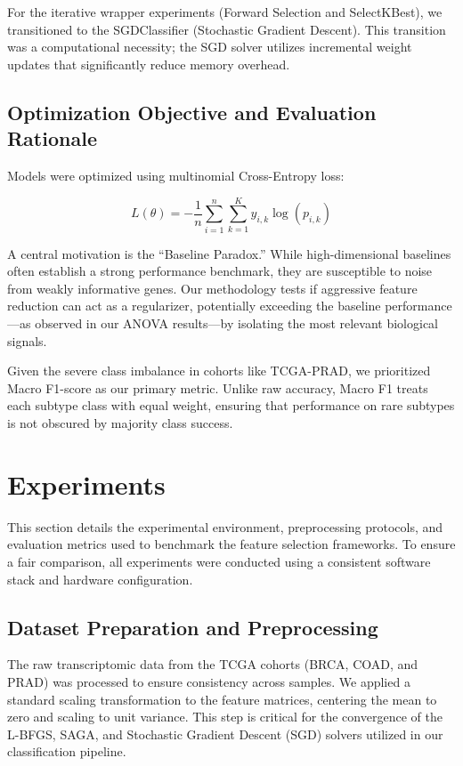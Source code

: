 \documentclass{article}
\begin{document}
For the iterative wrapper experiments (Forward Selection and SelectKBest), we transitioned to the SGDClassifier (Stochastic Gradient Descent). This transition was a computational necessity; the SGD solver utilizes incremental weight updates that significantly reduce memory overhead.

\subsection{Optimization Objective and Evaluation Rationale}

Models were optimized using multinomial Cross-Entropy loss:

\[
L(\theta) =
-\frac{1}{n}
\sum_{i=1}^{n}
\sum_{k=1}^{K}
y_{i,k}\log(p_{i,k})
\]

A central motivation is the ``Baseline Paradox.'' While high-dimensional baselines often establish a strong performance benchmark, they are susceptible to noise from weakly informative genes. Our methodology tests if aggressive feature reduction can act as a regularizer, potentially exceeding the baseline performance—as observed in our ANOVA results—by isolating the most relevant biological signals.

Given the severe class imbalance in cohorts like TCGA-PRAD, we prioritized Macro F1-score as our primary metric. Unlike raw accuracy, Macro F1 treats each subtype class with equal weight, ensuring that performance on rare subtypes is not obscured by majority class success.

\section{Experiments}

This section details the experimental environment, preprocessing protocols, and evaluation metrics used to benchmark the feature selection frameworks. To ensure a fair comparison, all experiments were conducted using a consistent software stack and hardware configuration.

\subsection{Dataset Preparation and Preprocessing}

The raw transcriptomic data from the TCGA cohorts (BRCA, COAD, and PRAD) was processed to ensure consistency across samples. We applied a standard scaling transformation to the feature matrices, centering the mean to zero and scaling to unit variance. This step is critical for the convergence of the L-BFGS, SAGA, and Stochastic Gradient Descent (SGD) solvers utilized in our classification pipeline.
\end{document}

